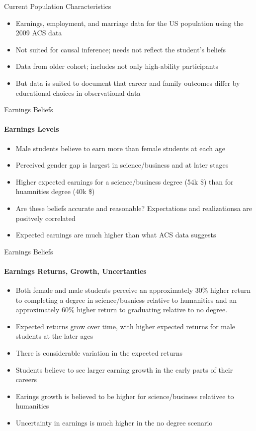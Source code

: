 \documentclass[12pt]{beamer}
\begin{document}
\begin{frame}{Current Population Characteristics}
    \begin{itemize}
        \item Earnings, employment, and marriage data for the US population using the 2009 ACS data
        \item Not suited for causal inference; needs not reflect the student's beliefs
        \item Data from older cohort; includes not only high-ability participants
        \item But data is suited to document that career and family outcomes differ by educational choices in observational data
    \end{itemize}
\end{frame}

\begin{frame}{Earnings Beliefs}
    \framesubtitle{Earnings Levels} 
    \begin{itemize}
        \item Male students believe to earn more than female students at each age
        \item Perceived gender gap is largest in science/business and at later stages
        \item Higher expected earnings for a science/business degree (54k \$) than for huamnities degree (40k \$)
        \item Are these beliefs accurate and reasonable? Expectations and realizationsa are positvely correlated
        \item Expected earnings are much higher than what ACS data suggests
    \end{itemize}
\end{frame}

\begin{frame}{Earnings Beliefs}
    \framesubtitle{Earnings Returns, Growth, Uncertanties} 
    \begin{itemize}
        \item Both female and male students perceive an approximately 30\% higher return to completing a degree in science/busniess relative to humanities and an approximately 60\% higher return to graduating relative to no degree.
        \item Expected returns grow over time, with higher expected returns for male students at the later ages
        \item There is considerable variation in the expected returns 
        \item Students believe to see larger earning growth in the early parts of their careers
        \item Earings growth is believed to be higher for science/business relativee to humanities
        \item Uncertainty in earnings is much higher in the no degree scenario
    \end{itemize}
\end{frame}
\end{document}
